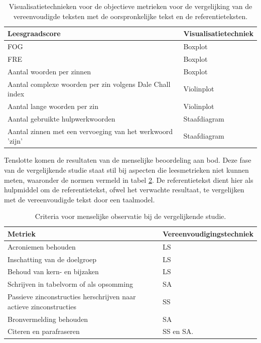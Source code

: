 \begin{center}
	\begin{table}[H]
		\begin{tabular}{ | m{8cm} | m{7cm} | } 
			\hline
			\textbf{Leesgraadscore} & \textbf{Visualisatietechniek }\\
			\hline
			FOG & Boxplot \\
			\hline
			FRE & Boxplot \\
			\hline
			Aantal woorden per zinnen & Boxplot \\
			\hline
			Aantal complexe woorden per zin volgens Dale Chall index & Violinplot \\
			\hline
			Aantal lange woorden per zin & Violinplot \\
			\hline
			Aantal gebruikte hulpwerkwoorden & Staafdiagram \\
			\hline
			Aantal zinnen met een vervoeging van het werkwoord 'zijn' & Staafdiagram \\
			\hline
		\end{tabular}
		\caption{Visualisatietechnieken voor de objectieve metrieken voor de vergelijking van de vereenvoudigde teksten met de oorspronkelijke tekst en de referentieteksten.}
		\label{table:verg-studie-metrieken}
	\end{table}
\end{center}

Tenslotte komen de resultaten van de menselijke beoordeling aan bod. Deze fase van de vergelijkende studie staat stil bij aspecten die leesmetrieken niet kunnen meten, waaronder de normen vermeld in tabel \ref{table:criteria-vergelijkende-studie-human-obv}. De referentietekst dient hier als hulpmiddel om de referentietekst, ofwel het verwachte resultaat, te vergelijken met de vereenvoudigde tekst door een taalmodel. 

\begin{table}[H]
	\begin{tabular}{| m{10cm} | m{2cm} |}
		\hline
		\textbf{Metriek} & \textbf{Vereenvoudigingstechniek} \\ \hline
		Acroniemen behouden & LS 	\\ \hline
		Inschatting van de doelgroep & LS	\\ \hline
		Behoud van kern- en bijzaken & LS \\ \hline
		Schrijven in tabelvorm of als opsomming & SA \\ \hline
		Passieve zinconstructies herschrijven naar actieve zinconstructies & SS \\ \hline
		Bronvermelding behouden &  SA \\ \hline
		Citeren en parafraseren & SS en SA. \\ \hline
	\end{tabular}
	\caption{Criteria voor menselijke observatie bij de vergelijkende studie.}
	\label{table:criteria-vergelijkende-studie-human-obv}
\end{table}

